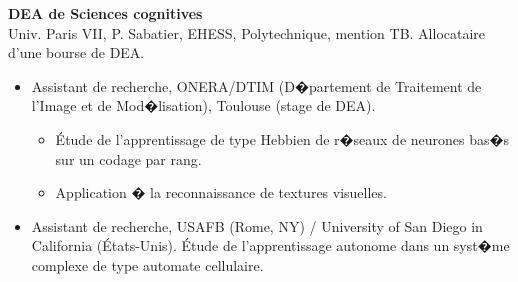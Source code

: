 \vspace*{.3cm}
	\textbf{DEA de Sciences cognitives} \hfill {} \\ Univ. Paris VII, P. Sabatier, EHESS, Polytechnique, mention TB. Allocataire d'une bourse de DEA.
	\begin{itemize}
			\item  Assistant de recherche, ONERA/DTIM (D�partement de Traitement de l'Image et de Mod�lisation), Toulouse (stage de DEA).
			\begin{itemize}
				\item  \'Etude de l'apprentissage de type Hebbien de r�seaux de neurones bas�s sur un codage par rang.
				\item  Application �  la reconnaissance de textures visuelles.
			\end{itemize} %
			\item Assistant de recherche, USAFB (Rome, NY)  / University of San Diego in California (\'Etats-Unis). %
			\'Etude de l'apprentissage autonome dans un syst�me complexe de type automate cellulaire. %
	\end{itemize} %

